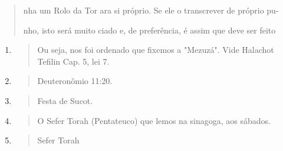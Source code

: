 \begin{quote}
nha um Rolo da Tor ara si próprio. Se ele o transcrever de próprio pu-

nho, isto será muito ciado e, de preferência, é assim que deve ser feito
\end{quote}

\begin{enumerate}
\def\labelenumi{\arabic{enumi}.}
\setcounter{enumi}{38}
\item
 \begin{quote}
 Ou seja, nos foi ordenado que fixemos a "Mezuzá". Vide Halachot
 Tefilin Cap. 5, lei 7.
 \end{quote}
\item
 \begin{quote}
 Deuteronômio 11:20.
 \end{quote}
\item
 \begin{quote}
 Festa de Sucot.
 \end{quote}
\item
 \begin{quote}
 O Sefer Torah (Pentateuco) que lemos na sinagoga, aos sábados.
 \end{quote}
\item
 \begin{quote}
 Sefer Torah
 \end{quote}
\end{enumerate}

